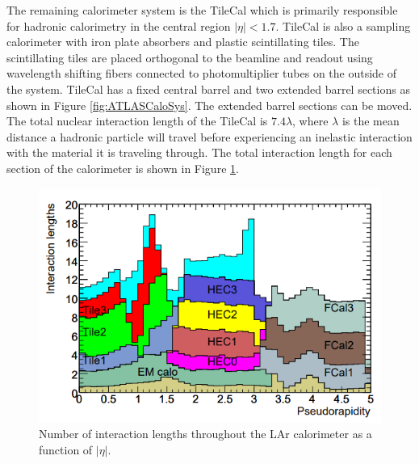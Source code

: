 The remaining calorimeter system is the TileCal which is primarily responsible for hadronic calorimetry in the central region $|\eta|<1.7$.  TileCal is also a sampling calorimeter with iron plate absorbers and plastic scintillating tiles. The scintillating tiles are placed orthogonal to the beamline and readout using wavelength shifting fibers connected to photomultiplier tubes on the outside of the system.  TileCal has a fixed central barrel and two extended barrel sections as shown in Figure \ref{fig:ATLASCaloSys}.  The extended barrel sections can be moved.  The total nuclear interaction length of the TileCal is $7.4\lambda$, where $\lambda$ is the mean distance a hadronic particle will travel before experiencing an inelastic interaction with the material it is traveling through.  The total interaction length for each section of the calorimeter is shown in Figure \ref{fig:InteractionLengths}.


\begin{figure}[ht!]
	\centering
	\includegraphics[width=0.8\columnwidth]{../ThesisImages/LHCImages/InteractionLengths.png}
	\caption[Number of interaction lengths throughout the LAr calorimeter as a function of $|\eta|$.]{Number of interaction lengths throughout the LAr calorimeter as a function of $|\eta|$.
	}
	\label{fig:InteractionLengths}
\end{figure}


